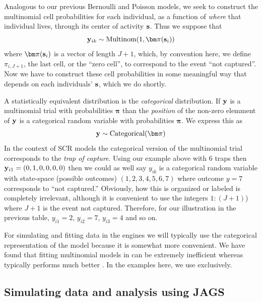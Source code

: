 Analogous to our previous Bernoulli and Poisson models, we seek to
construct the multinomial cell probabilities for each individual, as a
function of {\it where} that individual lives, through its center of
activity ${\bf s}$. Thus we suppose that
\begin{equation}
 {\bf y}_{ik} \sim \mbox{Multinom}(1, {\bm \pi}({\bf s}_{i}) )
\label{poisson-mn.eq.mn}
\end{equation}
where ${\bm \pi}({\bf s}_{i})$ is a vector of length $J+1$, which, by
convention here, we define $\pi_{i,J+1}$, the last cell, or the ``zero
cell'', to correspond to the event ``not captured''.  Now we have to
construct these cell probabilities in some meaningful way that depends
on each individuals' ${\bf s}$, which we do shortly.

A statistically equivalent distribution is the {\it categorical}
distribution.  If ${\bf y}$ is a multinomial trial with probabilities
${\bm \pi}$ than the {\it position} of the non-zero elemment of ${\bf
  y}$ is a categorical random variable with probabilities ${\bm \pi}$.
We express this as
\[
{\bf y} \sim \mbox{Categorical}( {\bm \pi} )
\]
In the context of SCR models the categorical version of the
multinomial trial corresponds to the {\it trap of capture}.  Using our
example above with 6 traps then ${\bf y}_{i1} = (0,1,0,0,0,0)$ then we
could as well say $y_{ik}$ is a categorical random variable with
state-space (possible outcomes) $(1,2,3,4,5,6,7)$ where outcome $y=7$
corresponds to ``not captured.'' Obviously, how this is organized or
labeled is completely irrelevant, although it is convenient to use the
integers $1:(J+1)$) where $J+1$ is the event not captured.  Therefore,
for our illustration in the previous table, $y_{i1} = 2$, $y_{i2} =
7$, $y_{i3} = 4$ and so on.

For simulating and fitting data in the \bugs engines we will typically use
the categorical representation of the model because it is somewhat
more convenient.  We have found that fitting multinomial models in
\winbugs can be extremely inefficient whereas \jags
typically performs much better \citep{converse_royle:2013}. In the examples here, we use \jags
 exclusively.





\subsection{Simulating data and analysis using JAGS}

